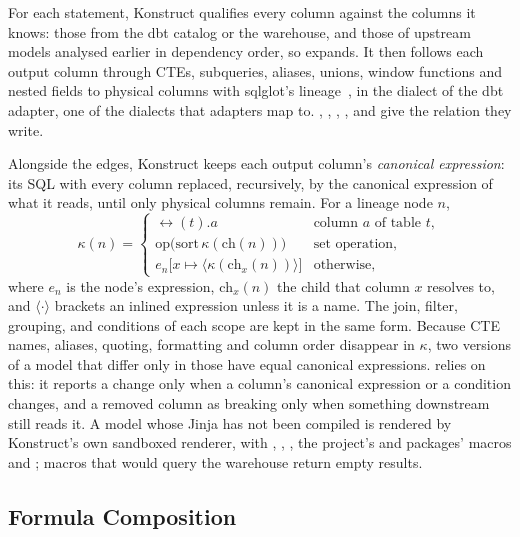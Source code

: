 For each statement, Konstruct qualifies every column against the columns it knows: those from
the dbt catalog or the warehouse, and those of upstream models analysed earlier in dependency
order, so  expands. It then follows each output column through CTEs, subqueries,
aliases, unions, window functions and nested fields to physical columns with sqlglot's
lineage~\citep{sqlglot}, in the dialect of the dbt adapter, one of the \sqlDialects{} dialects that adapters map to.
, , , ,  and
 give the relation they write.

Alongside the edges, Konstruct keeps each output column's \emph{canonical expression}: its SQL
with every column replaced, recursively, by the canonical expression of what it reads, until only
physical columns remain. For a lineage node $n$,
\begin{equation}
  \kappa(n) =
  \begin{cases}
    \rel(t).a & \text{column $a$ of table $t$},\\
    \mathrm{op}\big(\mathrm{sort}\,\kappa(\mathrm{ch}(n))\big) & \text{set operation},\\
    e_n\big[x \mapsto \langle \kappa(\mathrm{ch}_x(n)) \rangle\big] & \text{otherwise},
  \end{cases}
  \label{eq:canonical}
\end{equation}
where $e_n$ is the node's expression, $\mathrm{ch}_x(n)$ the child that column $x$ resolves to,
and $\langle\cdot\rangle$ brackets an inlined expression unless it is a name. The join, filter,
grouping,  and  conditions of each scope are kept in the same form.
Because CTE names, aliases, quoting, formatting and column order disappear in $\kappa$, two
versions of a model that differ only in those have equal canonical expressions.  relies on this: it reports a change only when a column's canonical expression or a
condition changes, and a removed column as breaking only when something downstream still reads
it. A model whose Jinja has not been compiled is rendered by Konstruct's own sandboxed renderer,
with , , , the project's and packages' macros and
; macros that would query the warehouse return empty results.

\subsection{Formula Composition}
\label{sec:compose}

